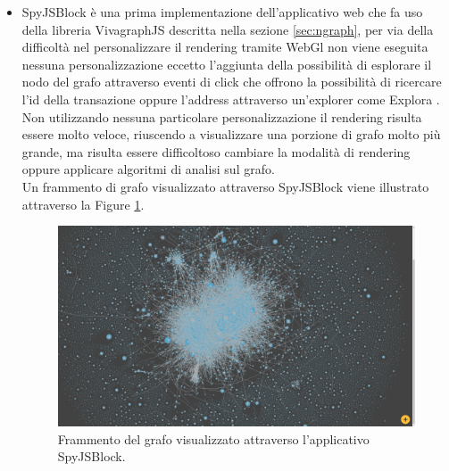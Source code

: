\begin{itemize}
  \item SpyJSBlock è una prima implementazione dell'applicativo web che fa uso della libreria VivagraphJS descritta nella sezione \ref{sec:ngraph}, per via della difficoltà nel personalizzare il rendering tramite WebGl non viene eseguita nessuna personalizzazione eccetto l'aggiunta della possibilità di esplorare il nodo del grafo attraverso eventi di click che offrono la possibilità di ricercare l'id della transazione oppure l'address attraverso un'explorer come Explora \cite{blockstream:esplora}.\\
  Non utilizzando nessuna particolare personalizzazione il rendering risulta essere molto veloce, riuscendo a visualizzare una porzione di grafo molto più grande, ma risulta essere difficoltoso cambiare la modalità di rendering oppure applicare algoritmi di analisi sul grafo.\\
  Un frammento di grafo visualizzato attraverso SpyJSBlock viene illustrato attraverso la Figure \ref{fig:vivagraphSpyJSBlock}.

  \begin{figure}
  \centering
   \includegraphics[scale=0.2]{images/demo/vivagraph.png}
   \caption{Frammento del grafo visualizzato attraverso l'applicativo SpyJSBlock.}\label{fig:vivagraphSpyJSBlock}
  \end{figure}


\end{itemize}

